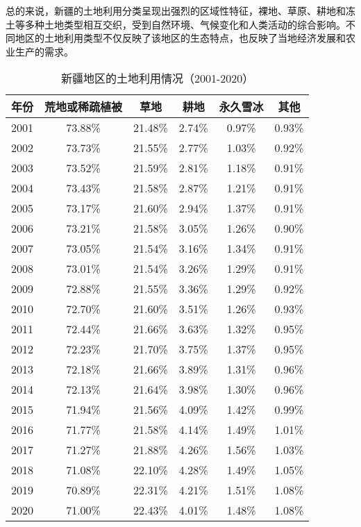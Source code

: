 \documentclass{article}
\begin{document}
		总的来说，新疆的土地利用分类呈现出强烈的区域性特征，裸地、草原、耕地和冻土等多种土地类型相互交织，受到自然环境、气候变化和人类活动的综合影响。不同地区的土地利用类型不仅反映了该地区的生态特点，也反映了当地经济发展和农业生产的需求。
		\begin{table}[H]
			\centering
			\begin{tabular}{|c|c|c|c|c|c|}
				\hline
				年份 & 荒地或稀疏植被 & 草地 & 耕地 & 永久雪冰 & 其他 \\
				\hline
				2001 & 73.88\% & 21.48\% & 2.74\% & 0.97\% & 0.93\% \\
				2002 & 73.73\% & 21.55\% & 2.77\% & 1.03\% & 0.92\% \\
				2003 & 73.52\% & 21.59\% & 2.81\% & 1.18\% & 0.91\% \\
				2004 & 73.43\% & 21.58\% & 2.87\% & 1.21\% & 0.91\% \\
				2005 & 73.17\% & 21.60\% & 2.94\% & 1.37\% & 0.91\% \\
				2006 & 73.21\% & 21.58\% & 3.05\% & 1.26\% & 0.90\% \\
				2007 & 73.05\% & 21.54\% & 3.16\% & 1.34\% & 0.91\% \\
				2008 & 73.01\% & 21.54\% & 3.26\% & 1.29\% & 0.91\% \\
				2009 & 72.88\% & 21.55\% & 3.36\% & 1.29\% & 0.92\% \\
				2010 & 72.70\% & 21.60\% & 3.51\% & 1.26\% & 0.93\% \\
				2011 & 72.44\% & 21.66\% & 3.63\% & 1.32\% & 0.95\% \\
				2012 & 72.23\% & 21.70\% & 3.75\% & 1.37\% & 0.95\% \\
				2013 & 72.18\% & 21.66\% & 3.89\% & 1.31\% & 0.96\% \\
				2014 & 72.13\% & 21.64\% & 3.98\% & 1.30\% & 0.96\% \\
				2015 & 71.94\% & 21.56\% & 4.09\% & 1.42\% & 0.99\% \\
				2016 & 71.77\% & 21.58\% & 4.14\% & 1.49\% & 1.01\% \\
				2017 & 71.27\% & 21.88\% & 4.26\% & 1.56\% & 1.03\% \\
				2018 & 71.08\% & 22.10\% & 4.28\% & 1.49\% & 1.05\% \\
				2019 & 70.89\% & 22.31\% & 4.21\% & 1.51\% & 1.08\% \\
				2020 & 71.00\% & 22.43\% & 4.01\% & 1.48\% & 1.08\% \\
				\hline
			\end{tabular}
			\caption{新疆地区的土地利用情况（2001-2020）}
		\end{table}
		
\end{document}
